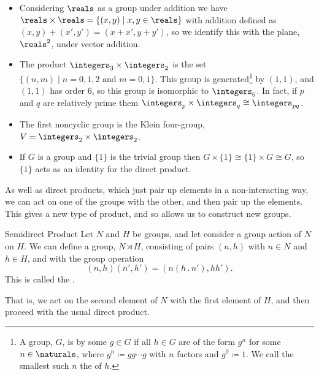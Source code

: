 \documentclass[fleqn]{NotesClass}
\newcommand{\cyclicGroupZ}[1][n]{\integers_{#1}}
\newcommand{\action}{\mathbin{.}}
\newcommand{\isomorphic}{\cong}
\begin{document}
    \begin{exm}{}{}
        \begin{itemize}
            \item Considering \(\reals\) as a group under addition we have \(\reals \times \reals = \{(x, y) \mid x, y \in \reals\}\) with addition defined as \((x, y) + (x', y') = (x + x', y + y')\), so we identify this with the plane, \(\reals^2\), under vector addition.
            \item The product \(\cyclicGroupZ[3] \times \cyclicGroupZ[2]\) is the set \(\{(n, m) \mid n = 0, 1, 2 \text{ and } m = 0, 1\}\).
            This group is generated\footnote{A group, \(G\), is  by some \(g \in G\) if all \(h \in G\) are of the form \(g^n\) for some \(n \in \naturals\), where \(g^n \coloneqq g g \dotsm g\) with \(n\) factors and \(g^0 \coloneqq 1\). We call the smallest such \(n\) the  of \(h\).} by \((1, 1)\), and \((1, 1)\) has order 6, so this group is isomorphic to \(\cyclicGroupZ[6]\).
            In fact, if \(p\) and \(q\) are relatively prime them \(\cyclicGroupZ[p] \times \cyclicGroupZ[q] \isomorphic \cyclicGroupZ[pq]\).
            \item The first noncyclic group is the Klein four-group, \(V = \cyclicGroupZ[2] \times \cyclicGroupZ[2]\).
            \item If \(G\) is a group and \(\{1\}\) is the trivial group then \(G \times \{1\} \isomorphic \{1\} \times G \isomorphic G\), so \(\{1\}\) acts as an identity for the direct product.
        \end{itemize}
    \end{exm}
    
    As well as direct products, which just pair up elements in a non-interacting way, we can act on one of the groups with the other, and then pair up the elements.
    This gives a new type of product, and so allows us to construct new groups.
    
    \begin{dfn}{Semidirect Product}{}
        Let \(N\) and \(H\) be groups, and let consider a group action of \(N\) on \(H\).
        We can define a group, \(N \rtimes H\), consisting of pairs \((n, h)\) with \(n \in N\) and \(h \in H\), and with the group operation
        \begin{equation}
            (n, h)(n', h') = (n(h \action n'), hh').
        \end{equation}
        This is called the .
    \end{dfn}
    That is, we act on the second element of \(N\) with the first element of \(H\), and then proceed with the usual direct product.
    
\end{document}
